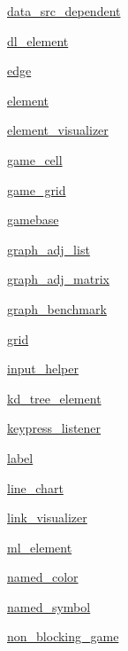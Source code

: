 \begin{DoxyCompactItemize}
\item 
 \mbox{\hyperlink{namespacebridges_1_1data__src__dependent}{data\+\_\+src\+\_\+dependent}}
\item 
 \mbox{\hyperlink{namespacebridges_1_1dl__element}{dl\+\_\+element}}
\item 
 \mbox{\hyperlink{namespacebridges_1_1edge}{edge}}
\item 
 \mbox{\hyperlink{namespacebridges_1_1element}{element}}
\item 
 \mbox{\hyperlink{namespacebridges_1_1element__visualizer}{element\+\_\+visualizer}}
\item 
 \mbox{\hyperlink{namespacebridges_1_1game__cell}{game\+\_\+cell}}
\item 
 \mbox{\hyperlink{namespacebridges_1_1game__grid}{game\+\_\+grid}}
\item 
 \mbox{\hyperlink{namespacebridges_1_1gamebase}{gamebase}}
\item 
 \mbox{\hyperlink{namespacebridges_1_1graph__adj__list}{graph\+\_\+adj\+\_\+list}}
\item 
 \mbox{\hyperlink{namespacebridges_1_1graph__adj__matrix}{graph\+\_\+adj\+\_\+matrix}}
\item 
 \mbox{\hyperlink{namespacebridges_1_1graph__benchmark}{graph\+\_\+benchmark}}
\item 
 \mbox{\hyperlink{namespacebridges_1_1grid}{grid}}
\item 
 \mbox{\hyperlink{namespacebridges_1_1input__helper}{input\+\_\+helper}}
\item 
 \mbox{\hyperlink{namespacebridges_1_1kd__tree__element}{kd\+\_\+tree\+\_\+element}}
\item 
 \mbox{\hyperlink{namespacebridges_1_1keypress__listener}{keypress\+\_\+listener}}
\item 
 \mbox{\hyperlink{namespacebridges_1_1label}{label}}
\item 
 \mbox{\hyperlink{namespacebridges_1_1line__chart}{line\+\_\+chart}}
\item 
 \mbox{\hyperlink{namespacebridges_1_1link__visualizer}{link\+\_\+visualizer}}
\item 
 \mbox{\hyperlink{namespacebridges_1_1ml__element}{ml\+\_\+element}}
\item 
 \mbox{\hyperlink{namespacebridges_1_1named__color}{named\+\_\+color}}
\item 
 \mbox{\hyperlink{namespacebridges_1_1named__symbol}{named\+\_\+symbol}}
\item 
 \mbox{\hyperlink{namespacebridges_1_1non__blocking__game}{non\+\_\+blocking\+\_\+game}}

\end{DoxyCompactItemize}
